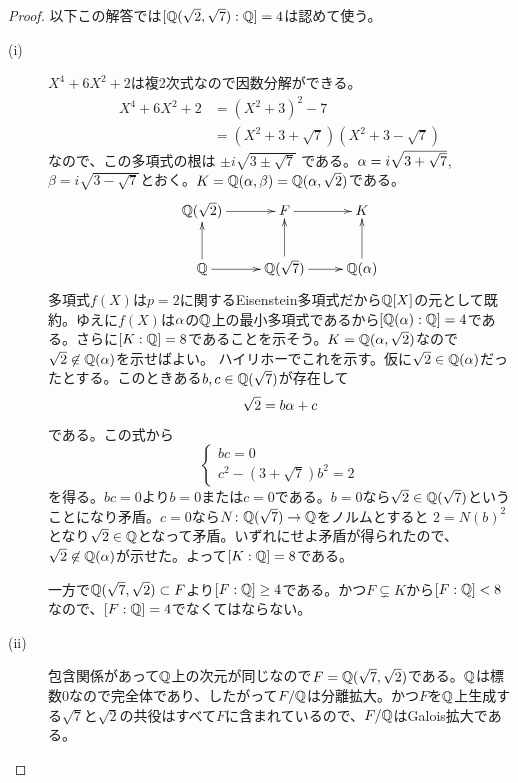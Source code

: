\newpage


\subsubsection{} %
\begin{proof} 以下この解答では$[{\mathbb Q}(\sqrt{2},\sqrt{7}): {\mathbb Q} ] = 4$は認めて使う。
  \begin{description}
\item[(i)] $X^4 + 6X^2 + 2$は複2次式なので因数分解ができる。
 \begin{align*}
  X^4 + 6X^2 + 2 &= (X^2 + 3)^2 - 7 \\
  &= (X^2 + 3 + \sqrt{7} )(X^2 + 3 - \sqrt{7} )
  \end{align*}
  なので、この多項式の根は
  $
  \pm i \sqrt{ 3 \pm \sqrt{7}  }
  $
  である。${\alpha} = i \sqrt{ 3 + \sqrt{7}  }  $, $\beta = i \sqrt{ 3 - \sqrt{7}  } $とおく。$K = {\mathbb Q}({\alpha}, \beta) = {\mathbb Q}({\alpha}, \sqrt{2})$である。
  \[
  \xymatrix{
  \Q(\sqrt{2}) \ar[r] & F \ar[r] & K \\
  \Q \ar[u] \ar[r] & \Q(\sqrt{7}) \ar[r] \ar[u] & \Q(\gra) \ar[u]
  }
  \]
  多項式$f(X)$は$p=2$に関するEisenstein多項式だから${\mathbb Q}[X]$の元として既約。ゆえに$f(X)$は${\alpha}$の${\mathbb Q}$上の最小多項式であるから$[{\mathbb Q}({\alpha} ) : {\mathbb Q}] = 4$である。さらに$[K:{\mathbb Q}] = 8$であることを示そう。$K = {\mathbb Q}({\alpha}, \sqrt{2})$なので
  $\sqrt{2} \not\in {\mathbb Q}({\alpha})$を示せばよい。
  ハイリホーでこれを示す。仮に$\sqrt{2} \in {\mathbb Q}({\alpha})$だったとする。このときある$b,c \in {\mathbb Q}(\sqrt{7})$が存在して
  \[
  \sqrt{2} = b {\alpha} + c
  \]
  である。この式から
  \[
  \begin{cases}
    bc = 0 \\
    c^2 - (3 + \sqrt{7})b^2 = 2
  \end{cases}
  \]
を得る。$bc=0$より$b=0$または$c=0$である。$b=0$なら$\sqrt{2} \in {\mathbb Q}(\sqrt{7})$ということになり矛盾。$c=0$なら$N \colon {\mathbb Q}(\sqrt{7}) \to {\mathbb Q}$をノルムとすると
$
2 =  N(b)^2
$
となり$\sqrt{2} \in {\mathbb Q}$となって矛盾。いずれにせよ矛盾が得られたので、$\sqrt{2} \not\in {\mathbb Q}({\alpha})$が示せた。よって$[K:{\mathbb Q}] = 8$である。

  一方で${\mathbb Q}(\sqrt{7}, \sqrt{2}) \subset F$より$[F : {\mathbb Q}] \geq 4$である。かつ$F \subsetneq K$から$[F : {\mathbb Q}] < 8$なので、$[F : {\mathbb Q}] = 4$でなくてはならない。
  \item[(ii)] 包含関係があって${\mathbb Q}$上の次元が同じなので$F = {\mathbb Q}(\sqrt{7}, \sqrt{2})$である。${\mathbb Q}$は標数$0$なので完全体であり、したがって$F/{\mathbb Q}$は分離拡大。かつ$F$を${\mathbb Q}$上生成する$\sqrt{7}$と$\sqrt{2}$の共役はすべて$F$に含まれているので、$F/{\mathbb Q}$はGalois拡大である。
  \end{description}
\end{proof}



